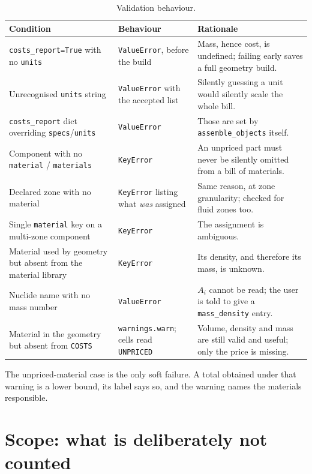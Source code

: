\documentclass[9pt,a4paper]{extarticle}
\newcommand{\code}[1]{\texttt{\small #1}}
\begin{document}
\begin{table}[h]
\centering
\footnotesize
\renewcommand{\arraystretch}{1.2}
\begin{tabular}{@{}p{5.0cm}p{2.4cm}p{7.0cm}@{}}
\toprule
\textbf{Condition} & \textbf{Behaviour} & \textbf{Rationale} \\
\midrule
\code{costs\_report=True} with no \code{units} & \code{ValueError}, before the build &
Mass, hence cost, is undefined; failing early saves a full geometry build. \\
Unrecognised \code{units} string & \code{ValueError} with the accepted list &
Silently guessing a unit would silently scale the whole bill. \\
\code{costs\_report} dict overriding \code{specs}/\code{units} & \code{ValueError} &
Those are set by \code{assemble\_objects} itself. \\
Component with no \code{material} / \code{materials} & \code{KeyError} &
An unpriced part must never be silently omitted from a bill of materials. \\
Declared zone with no material & \code{KeyError} listing what \emph{was} assigned &
Same reason, at zone granularity; checked for fluid zones too. \\
Single \code{material} key on a multi-zone component & \code{KeyError} &
The assignment is ambiguous. \\
Material used by geometry but absent from the material library & \code{KeyError} &
Its density, and therefore its mass, is unknown. \\
Nuclide name with no mass number & \code{ValueError} &
$A_i$ cannot be read; the user is told to give a \code{mass\_density} entry. \\
Material in the geometry but absent from \code{COSTS} & \code{warnings.warn}; cells read \code{UNPRICED} &
Volume, density and mass are still valid and useful; only the price is missing. \\
\bottomrule
\end{tabular}
\caption{Validation behaviour.}
\end{table}

The unpriced-material case is the only soft failure. A total obtained under that
warning is a lower bound, its label says so, and the warning names the materials
responsible.

\section{Scope: what is deliberately not counted}
\label{sec:scope}
\end{document}
